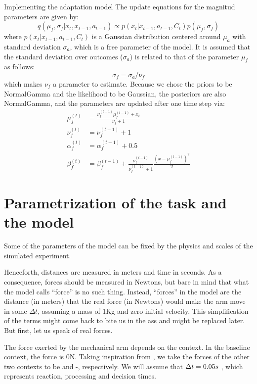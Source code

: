 \documentclass{report}
\begin{document}
\begin{chapter}{Implementing the adaptation model}
The update equations for the magnitud parameters are given by:
\begin{equation}
q(\mu_f, \sigma_f | x_t, x_{t-1}, a_{t-1}) \propto p(x_t |
x_{t-1}, a_{t-1}, C_t)p(\mu_f, \sigma_f) \label{eqn:context-from-x}
\end{equation}
where $p(x_t | x_{t-1}, a_{t-1}, C_t)$ is a Gaussian distribution centered
around $\mu_a$ with standard deviation $\sigma_a$, which is a free parameter of
the model. It is assumed that the standard deviation over outcomes ($\sigma_a$)
is related to that of the parameter $\mu_f$ as follows:
\begin{equation}
\sigma_f = \sigma_a / \nu_f
\end{equation}
which makes $\nu_f$ a parameter to estimate. Because we chose the priors to be
NormalGamma and the likelihood to be Gaussian, the posteriors are also
NormalGamma, and the parameters are updated after one time step via:
\begin{align}
  \mu_f^{(t)} &= \frac{\nu_f^{(t-1)} \mu_f^{(t-1)} + x_t}{\nu_f + 1} \\
  \nu_f^{(t)} &= \nu_f^{(t-1)} + 1 \\
  \alpha_f^{(t)} &= \alpha_f^{(t-1)} + 0.5 \\
  \beta_f^{(t)} &= \beta_f^{(t-1)} + \frac{\nu_f^{(t-1)}}{\nu_f^{(t-1)} +
                  1}\frac{\left(x - \mu_f^{(t-1)}\right)^2}{2}
\end{align}

\section{Parametrization of the task and the model}
Some of the parameters of the model can be fixed by the physics and scales of
the simulated experiment.

Henceforth, distances are measured in meters and time in seconds. As a
consequence, forces should be measured in Newtons, but bare in mind that what
the model calls ``force'' is no such thing. Instead, ``forces'' in the model
are the distance (in meters) that the real force (in Newtons) would make the
arm move in some $\Delta t$, assuming a mass of 1Kg and zero initial
velocity. This simplification of the terms might come back to bite us in the
ass and might be replaced later. But first, let us speak of real forces.

The force exerted by the mechanical arm depends on the context. In the baseline
context, the force is 0N. Taking inspiration from , we
take the forces of the other two contexts to be \force and -\force,
respectively. We will assume that $\Delta t = 0.05s$ , which represents reaction, processing and decision
times.


\end{chapter}
\end{document}
